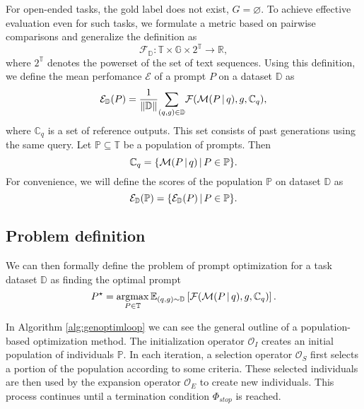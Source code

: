 For open-ended tasks, the gold label does not exist, $G = \varnothing$. To achieve effective evaluation even for such tasks, 
we formulate a metric based on pairwise comparisons and generalize the definition as
\begin{equation}
    \mathcal{F}_{\mathbb{D}}: \mathbb{T} \times \mathbb{G} \times 2^\mathbb{T} \rightarrow \mathbb{R},
\end{equation}
where $2^\mathbb{T}$ denotes the powerset of the set of text sequences. Using this definition, we define the mean perfomance $\mathcal{E}$ of a prompt $P$ on a dataset $\mathbb{D}$ as
\begin{equation}
    \mathcal{E}_{\mathbb{D}}(P) = \frac{1}{\Vert \mathbb{D} \Vert}\underset{(q,g)\in \mathbb{D}}{\sum}\mathcal{F}(\mathcal{M}(P\, \vert \, q), g, \mathbb{C}_q),
\end{equation}
where $\mathbb{C}_q$ is a set of reference outputs. This set consists of past generations using the same query.
Let $\mathbb{P} \subseteq \mathbb{T}$ be a population of prompts. Then 
\begin{equation}
    \mathbb{C}_q = \{\mathcal{M}(P\, \vert \, q)\, \vert \, P \in \mathbb{P}\}.
\end{equation}
For convenience, we will define the scores of the population $\mathbb{P}$ on dataset $\mathbb{D}$ as
\begin{equation}
    \mathcal{E}_{\mathbb{D}}(\mathbb{P}) = \{\mathcal{E}_{\mathbb{D}}(P)\, \vert \, P\in \mathbb{P}\}.
\end{equation}

\subsection{Problem definition}
We can then formally define the problem of prompt optimization for a task dataset $\mathbb{D}$ as finding the optimal prompt 
\begin{equation}
    \label{eq:optimdef}
    P^{\star} = \underset{P\in\mathbb{T}}{\operatorname{argmax}}\,\mathbb{E}_{(q, g) \sim \mathbb{D}}\left[\mathcal{F}(\mathcal{M}(P \, \vert \, q), g, \mathbb{C}_q)\right].
\end{equation}

In Algorithm \ref{alg:genoptimloop} we can see the general outline of a population-based optimization method.
The initialization operator $\mathcal{O}_I$ creates an initial population of individuals $\mathbb{P}$. 
In each iteration, a selection operator $\mathcal{O}_S$ first selects a portion of the population according to some criteria. 
These selected individuals are then used by the expansion operator $\mathcal{O}_E$ to create new individuals.
This process continues until a termination condition $\Phi_{stop}$ is reached.


